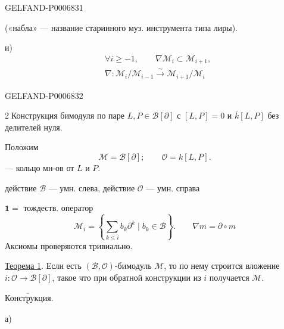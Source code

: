 \begin{GelfandAdjacentEvidence}{GELFAND-P000683}{1}

(«набла» --- название старинного муз. инструмента типа лиры).

и)
\[
\begin{aligned}
&\forall i\geq-1,\qquad\nabla\mathcal M_i\subset\mathcal M_{i+1},\\
&\nabla:\mathcal M_i/\mathcal M_{i-1}
   \overset{\sim}{\longrightarrow}\mathcal M_{i+1}/\mathcal M_i
\end{aligned}
\]
\end{GelfandAdjacentEvidence}
\begin{GelfandAdjacentEvidence}{GELFAND-P000683}{2}


\textcircled{2}\enspace Конструкция бимодуля по паре \(L,P\in\mathcal B[\partial]\)
с \([L,P]=0\) и \(\bar k[L,P]\) без делителей нуля.

Положим
\[
\mathcal M=\mathcal B[\partial];\qquad \mathcal O=k[L,P].
\]
--- кольцо мн-ов от \(L\) и \(P\).

действие \(\mathcal B\) --- умн. слева, действие \(\mathcal O\) --- умн. справа

\(\mathbf1=\) тождеств. оператор
\[
\mathcal M_i=\left\{\sum_{k\leq i}b_k\partial^k\mid b_k\in\mathcal B\right\}.
\qquad
\nabla m=\partial\circ m
\]
Аксиомы проверяются тривиально.

\underline{Теорема 1}. Если есть \((\mathcal B,\mathcal O)\)-бимодуль
\(\mathcal M\), то по нему строится вложение \(i:\mathcal O\longrightarrow\mathcal B[\partial]\),
такое что при обратной конструкции из \(i\) получается \(\mathcal M\).

\(\overline{\underline{\text{Конструкция}}}\).

а)
\end{GelfandAdjacentEvidence}
